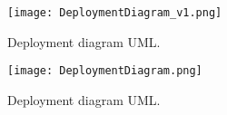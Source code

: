 \begin{figure}[h]
    \centering
    \texttt{[image: DeploymentDiagram\_v1.png]}
    \caption{Deployment diagram UML.}\label{fig:deploymentDiagram}
\end{figure}
\begin{figure}[h]
    \centering
    \texttt{[image: DeploymentDiagram.png]}
    \caption{Deployment diagram UML.}\label{fig:deploymentDiagramLinda}
\end{figure}